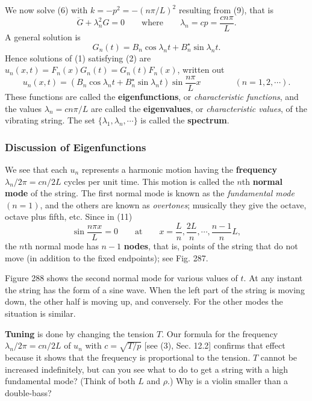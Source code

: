 \documentclass[12pt, leqno, oneside]{amsart}
\begin{document}
We now solve (6) with $k=-p^2=-(n\pi/L)^2$ resulting from (9), that is
\begin{equation}
  \tag{11*}
    \ddot{G}+\lambda_n^2G=0 \qquad \text{where} \qquad
    \lambda_n=cp=\frac{cn\pi}{L}.
\end{equation}
A general solution is
\begin{equation}
  \nonumber
    G_n(t)=B_n\cos{\lambda_n t} + B_n^\star\sin{\lambda_n t}.
\end{equation}
Hence solutions of (1) satisfying (2) are $u_n(x,t)=F_n(x)G_n(t)=G_n(t)F_n(x)$,
written out
\begin{equation}
    u_n(x,t)=(B_n\cos{\lambda_n t} + B_n^\star\sin{\lambda_n t})
    \sin{\frac{n\pi}{L} x} \qquad \qquad (n=1,2,\dotsb).
\end{equation}
These functions are called the \textbf{eigenfunctions}, or \emph{characteristic
functions}, and the values $\lambda_n=cn\pi/L$
are called the \textbf{eigenvalues}, or \emph{characteristic values}, of the vibrating string.
The set $\{\lambda_1,\lambda_n,\dotsb\}$ is called the \textbf{spectrum}.

\subsubsection{Discussion of Eigenfunctions}

We see that each $u_n$ represents a harmonic motion having
the \textbf{frequency} $\lambda_n/2\pi=cn/2L$ cycles per unit time. This motion is called the 
$n$th \textbf{normal mode} of the string. The first normal mode is known as the
\emph{fundamental mode} $(n=1)$, and the others are known as \emph{overtones}; musically they 
give the octave, octave plus fifth, etc. Since in (11)
\begin{equation}
  \nonumber
    \sin{\frac{n\pi x}{L}}=0 \qquad \text{at} \qquad x=\frac{L}{n},\frac{2L}{n},\dotsb,\frac{n-1}{n}L,
\end{equation}
the $n$th normal mode has $n-1$ \textbf{nodes}, that is, points of the string that do not move (in
addition to the fixed endpoints); see Fig. 287.

Figure 288 shows the second normal mode for various values of $t$. At any instant the
string has the form of a sine wave. When the left part of the string is moving down, the
other half is moving up, and conversely. For the other modes the situation is similar.

\textbf{Tuning} is done by changing the tension $T$. Our formula for the frequency
$\lambda_n/2\pi=cn/2L$ of $u_n$  with $c=\sqrt{T/p}$ [see (3), Sec. 12.2] confirms that 
effect because it shows that the frequency is proportional to the tension. $T$ cannot be 
increased indefinitely, but can you see what to do to get a string with a high 
fundamental mode? (Think of both $L$ and $\rho$.) Why is a violin smaller than a double-bass?
\end{document}
